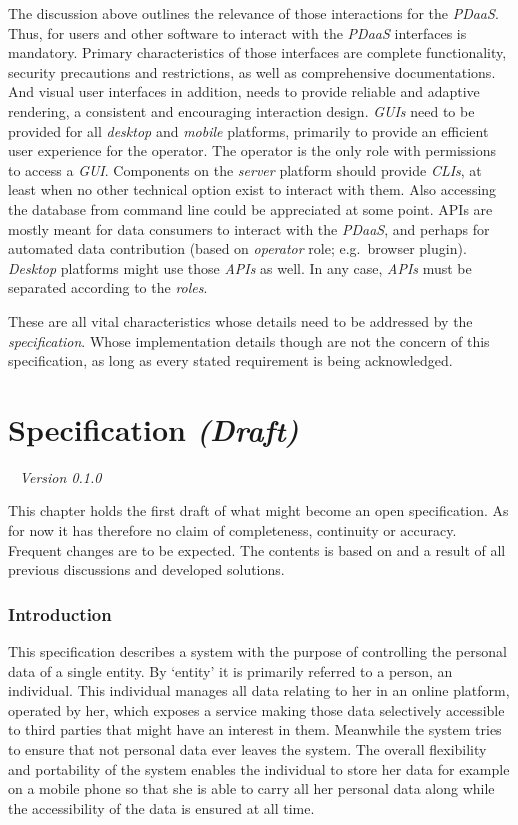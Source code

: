 \documentclass[12pt,english,a4paper,titlepage,cleardoublepage=empty,dottedtoc]{report}
\begin{document}
The discussion above outlines the relevance of those interactions for
the \emph{PDaaS}. Thus, for users and other software to interact with
the \emph{PDaaS} interfaces is mandatory. Primary characteristics of
those interfaces are complete functionality, security precautions and
restrictions, as well as comprehensive documentations. And visual user
interfaces in addition, needs to provide reliable and adaptive
rendering, a consistent and encouraging interaction design. \emph{GUIs}
need to be provided for all \emph{desktop} and \emph{mobile} platforms,
primarily to provide an efficient user experience for the operator. The
operator is the only role with permissions to access a \emph{GUI}.
Components on the \emph{server} platform should provide \emph{CLIs}, at
least when no other technical option exist to interact with them. Also
accessing the database from command line could be appreciated at some
point. APIs are mostly meant for data consumers to interact with the
\emph{PDaaS}, and perhaps for automated data contribution (based on
\emph{operator} role; e.g.~browser plugin). \emph{Desktop} platforms
might use those \emph{APIs} as well. In any case, \emph{APIs} must be
separated according to the \emph{roles}.

These are all vital characteristics whose details need to be addressed
by the \emph{specification}. Whose implementation details though are not
the concern of this specification, as long as every stated requirement
is being acknowledged.

\chapter{\texorpdfstring{Specification
\emph{(Draft)}}{Specification (Draft)}}\label{specification-draft}

\hfill~ \emph{Version 0.1.0}

This chapter holds the first draft of what might become an open
specification. As for now it has therefore no claim of completeness,
continuity or accuracy. Frequent changes are to be expected. The
contents is based on and a result of all previous discussions and
developed solutions.

\subsection*{Introduction}\label{introduction-1}

This specification describes a system with the purpose of controlling
the personal data of a single entity. By `entity' it is primarily
referred to a person, an individual. This individual manages all data
relating to her in an online platform, operated by her, which exposes a
service making those data selectively accessible to third parties that
might have an interest in them. Meanwhile the system tries to ensure
that not personal data ever leaves the system. The overall flexibility
and portability of the system enables the individual to store her data
for example on a mobile phone so that she is able to carry all her
personal data along while the accessibility of the data is ensured at
all time.
\end{document}
